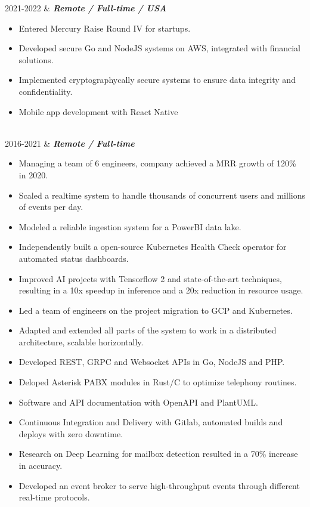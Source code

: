 \documentclass[]{cv-mauri}
\begin{document}
\begin{tabularcv}
	2021-2022   &   
					\textbf{\textit{Remote / Full-time / USA}}

			\begin{itemize}
				\item Entered Mercury Raise Round IV for startups.
				\item Developed secure Go and NodeJS systems on AWS, integrated with financial solutions.
				\item Implemented cryptographycally secure systems to ensure data integrity and confidentiality.
				\item Mobile app development with React Native
			\end{itemize}
					\\[\vspacepar]

    2016-2021   &   
                    \textbf{\textit{Remote / Full-time}}
            \begin{itemize}
            	\item Managing a team of 6 engineers, company achieved a MRR growth of 120\% in 2020.
            	\item Scaled a realtime system to handle thousands of concurrent users and millions of events per day.
            	\item Modeled a reliable ingestion system for a PowerBI data lake.
            	\item Independently built a open-source Kubernetes Health Check operator for automated status dashboards.
            	\item Improved AI projects with Tensorflow 2 and state-of-the-art techniques, resulting in a 10x speedup in inference and a 20x reduction in resource usage.
		    	\item Led a team of engineers on the project migration to GCP and Kubernetes.
		    	\item Adapted and extended all parts of the system to work in a distributed architecture, scalable horizontally.
		    	\item Developed REST, GRPC and Websocket APIs in Go, NodeJS and PHP.
		    	\item Deloped Asterisk PABX modules in Rust/C to optimize telephony routines.
		    	\item Software and API documentation with OpenAPI and PlantUML.
		    	\item Continuous Integration and Delivery with Gitlab, automated builds and deploys with zero downtime.
		    	\item Research on Deep Learning for mailbox detection resulted in a 70\% increase in accuracy.
		    	\item Developed an event broker to serve high-throughput events through different real-time protocols.
			\end{itemize}


\end{tabularcv}
\end{document}
